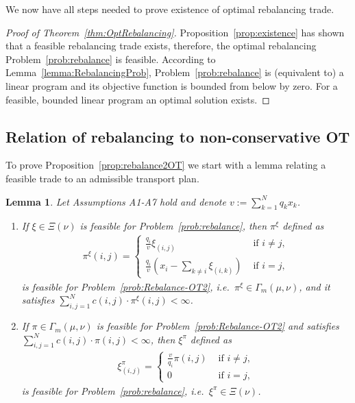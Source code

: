 \documentclass{article}
\newtheorem{lemma}[theorem]{Lemma}
\theoremstyle{definition}
\begin{document}
We now have all steps needed to prove existence of optimal rebalancing trade.
\begin{proof}[Proof of Theorem~\ref{thm:OptRebalancing}]
Proposition~\ref{prop:existence} has shown that a feasible rebalancing trade exists, therefore, the optimal rebalancing Problem~\ref{prob:rebalance} is feasible. According to Lemma~\ref{lemma:RebalancingProb},  Problem~\ref{prob:rebalance} is (equivalent to) a linear program and its objective function is bounded from below by zero. For a feasible, bounded linear program an optimal solution exists.  
\end{proof}



\subsection{Relation of rebalancing to non-conservative OT} \label{append:rebalance2OT}
To prove Proposition~\ref{prop:rebalance2OT} we start with a lemma relating a feasible trade to an admissible transport plan.
\begin{lemma}\label{lemma:rebalance2OT}
Let Assumptions A1-A7 hold and denote $v:= \sum_{k=1}^N q_k x_k$.
\begin{enumerate}
\item[a)] If $\xi \in \Xi(\nu)$ is feasible for Problem~\ref{prob:rebalance}, then $\pi^\xi$ defined as
\begin{align*}
\pi^\xi (i,j) = \begin{cases}
    \frac{q_i}{v} \xi_{(i,j)} & \text{ if } i \neq j, \\
    \frac{q_i}{v} \left( x_i - \sum_{k \neq i} \xi_{(i,k)} \right) & \text{ if } i = j,
\end{cases}    
\end{align*}
is feasible for Problem~\ref{prob:Rebalance-OT2}, i.e.~$\pi^\xi \in \Gamma_m (\mu, \nu)$, and it satisfies $\sum_{i,j =1}^N c(i,j) \cdot  \pi^\xi(i,j) < \infty$.

\item[b)] If $\pi \in \Gamma_m (\mu, \nu)$ is feasible for Problem~\ref{prob:Rebalance-OT2} and satisfies $\sum_{i,j =1}^N c(i,j) \cdot  \pi(i,j) < \infty$, then $\xi^\pi$ defined as
\begin{align*}
    \xi^\pi_{(i,j)} = \begin{cases}
        \frac{v}{q_i} \pi(i,j) & \text{ if } i \neq j, \\
        0 & \text{ if } i = j,
    \end{cases}
\end{align*}
is feasible for Problem~\ref{prob:rebalance}, i.e.~$\xi^\pi \in \Xi (\nu)$.
\end{enumerate}
\end{lemma}
\end{document}
